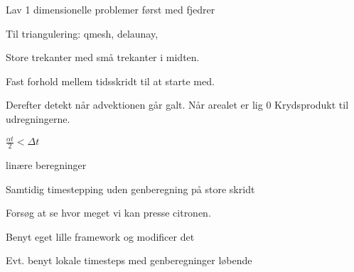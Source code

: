 \documentclass[11pt,a4paper]{article}
\title{}
\author{Malte Stær Nissen}
\begin{document}
\maketitle

Lav 1 dimensionelle problemer først med fjedrer

Til triangulering:
qmesh,
delaunay,

Store trekanter med små trekanter i midten.

Fast forhold mellem tidsskridt til at starte med.

Derefter detekt når advektionen går galt.
Når arealet er lig 0
Krydsprodukt til udregningerne.

$\frac{\alpha t}{2} < \Delta t$

linære beregninger

Samtidig timestepping uden genberegning på store skridt

Forsøg at se hvor meget vi kan presse citronen.

Benyt eget lille framework og modificer det


Evt. benyt lokale timesteps med genberegninger løbende
\end{document}
